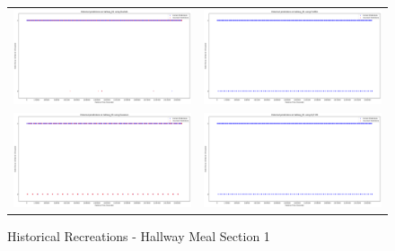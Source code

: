 \begin{figure}
  \begin{tabular}{cc}
    {\includegraphics[width = 3in]{images/results/Historical_hallway_M1_Duckett.png}} &
    {\includegraphics[width = 3in]{images/results/Historical_hallway_M1_FreMEn.png}} \\
    {\includegraphics[width = 3in]{images/results/Historical_hallway_M1_Gaussian.png}} &
    {\includegraphics[width = 3in]{images/results/Historical_hallway_M1_HyT-EM.png}} \\
  \end{tabular}
  \caption{Historical Recreations - Hallway Meal Section 1}
\end{figure}

